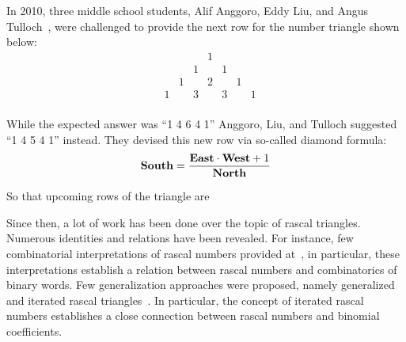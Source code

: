 In 2010, three middle school students, Alif Anggoro, Eddy Liu, and Angus Tulloch~\cite{anggoro2010rascal},
were challenged to provide the next row for the number triangle shown below:
\[
    \begin{array}{cccccccc}
        &   &   &   & 1 &   &   &   \\
        &   &   & 1 &   & 1 &   &   \\
        &   & 1 &   & 2 &   & 1 &   \\
        & 1 &   & 3 &   & 3 &   & 1 \\
    \end{array}
\]

While the expected answer was ``1 4 6 4 1'' Anggoro, Liu, and Tulloch suggested ``1 4 5 4 1'' instead.
They devised this new row via so-called diamond formula:
\begin{align*}
    \mathbf{South}  = \frac{\mathbf{East} \cdot \mathbf{West} + 1}{\mathbf{North}}
\end{align*}

So that upcoming rows of the triangle are


Since then, a lot of work has been done over the topic of rascal triangles.
Numerous identities and relations have been revealed.
For instance, few combinatorial interpretations of rascal numbers provided at~\cite{gibbs2024two}, in particular,
these interpretations establish a relation between rascal numbers and combinatorics of binary words.
Few generalization approaches were proposed, namely generalized
and iterated rascal triangles~\cite{hotchkiss2019generalized,gregory2023iterated}.
In particular, the concept of iterated rascal numbers establishes a close connection between rascal numbers and binomial
coefficients.
